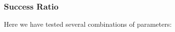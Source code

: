 \documentclass[preprint,notitlepage,amsmath,amssymb,floatfix]{revtex4-1}
\begin{document}
\subsubsection{Success Ratio}
Here we have tested several combinations of parameters:





\end{document}
